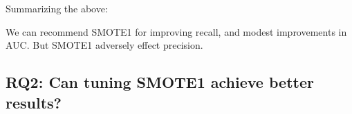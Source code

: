 





\noindent
Summarizing the above:
\begin{lesson1}
We can recommend SMOTE1 for improving recall, and modest improvements in AUC. But  SMOTE1 adversely effect
precision.
\end{lesson1}

\subsection{\textbf{RQ2: Can tuning SMOTE1 achieve better results?}}

